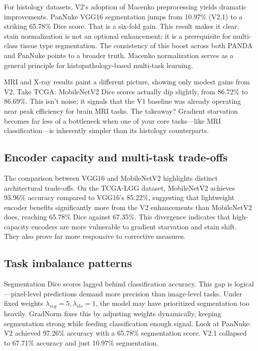\documentclass[conference,a4paper]{IEEEtran}
\begin{document}
For histology datasets, V2’s adoption of Macenko preprocessing yields dramatic improvements. PanNuke VGG16 segmentation jumps from 10.97\% (V2.1) to a striking 65.78\% Dice score. That is a six-fold gain. This result makes it clear: stain normalization is not an optional enhancement; it is a prerequisite for multi-class tissue type segmentation. The consistency of this boost across both PANDA and PanNuke points to a broader truth. Macenko normalization serves as a general principle for histopathology-based multi-task learning.

MRI and X-ray results paint a different picture, showing only modest gains from V2. Take TCGA: MobileNetV2 Dice scores actually dip slightly, from 86.72\% to 86.69\%. This isn't noise; it signals that the V1 baseline was already operating near peak efficiency for brain MRI tasks. The takeaway? Gradient starvation becomes far less of a bottleneck when one of your core tasks—like MRI classification—is inherently simpler than its histology counterparts.

\subsection{Encoder capacity and multi-task trade-offs}
The comparison between VGG16 and MobileNetV2 highlights distinct architectural trade-offs. On the TCGA-LGG dataset, MobileNetV2 achieves 93.96\% accuracy compared to VGG16's 85.22\%, suggesting that lightweight encoder benefits significantly more from the V2 enhancements than MobileNetV2 does, reaching 65.78\% Dice against 67.35\%. This divergence indicates that high-capacity encoders are more vulnerable to gradient starvation and stain shift. They also prove far more responsive to corrective measures.

\subsection{Task imbalance patterns}
Segmentation Dice scores lagged behind classification accuracy. This gap is logical—pixel-level predictions demand more precision than image-level tasks. Under fixed weights $\lambda_{seg}=5, \lambda_{cls}=1$, the model may have prioritized segmentation too heavily. GradNorm fixes this by adjusting weights dynamically, keeping segmentation strong while feeding classification enough signal. Look at PanNuke: V2 achieved 97.26\% accuracy with a 65.78\% segmentation score. V2.1 collapsed to 67.71\% accuracy and just 10.97\% segmentation.
\end{document}
